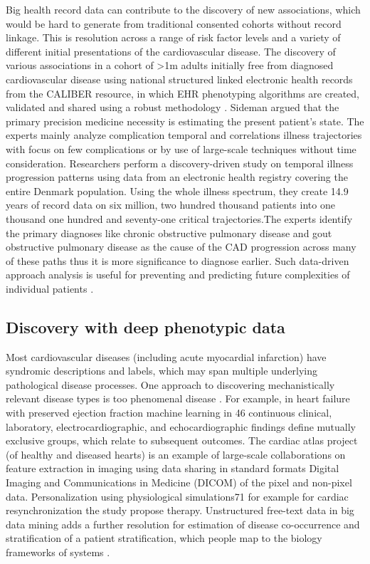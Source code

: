 \documentclass[sigconf]{acmart}
\begin{document}
Big health record data can contribute to the discovery of new associations, which would be hard to generate from traditional consented cohorts without record linkage.  This is resolution across a range of risk factor levels and a variety of different initial presentations of the cardiovascular disease. The discovery of various associations in a cohort of >1m adults initially free from diagnosed cardiovascular disease using national structured linked electronic health records from the CALIBER resource, in which EHR phenotyping algorithms are created, validated and shared using a robust methodology \cite{wang2005framingham}.
Sideman \cite{sideman1985simulation}argued that the primary precision medicine necessity is estimating the present patient's state. The experts mainly analyze complication temporal and correlations illness trajectories with focus on few complications or by use of large-scale techniques without time consideration. Researchers perform a discovery-driven study on temporal illness progression patterns using data from an electronic health registry covering the entire Denmark population. Using the whole illness spectrum, they create 14.9 years of record data on six million, two hundred thousand patients into one thousand one hundred and seventy-one critical trajectories.The experts identify the primary diagnoses like chronic obstructive pulmonary disease and gout obstructive pulmonary disease as the cause of the CAD progression across many of these paths thus it is more significance to diagnose earlier. Such data-driven approach analysis is useful for preventing and predicting future complexities of individual patients \cite{sideman1985simulation}.

\subsection{Discovery with deep phenotypic data}
Most cardiovascular diseases (including acute myocardial infarction) have syndromic descriptions and labels, which may span multiple underlying pathological disease processes. One approach to discovering mechanistically relevant disease types is too phenomenal disease \cite{sahaf2011comparing}. For example, in heart failure with preserved ejection fraction machine learning in 46 continuous clinical, laboratory, electrocardiographic, and echocardiographic findings define mutually exclusive groups, which relate to subsequent outcomes. The cardiac atlas project (of healthy and diseased hearts) is an example of large-scale collaborations on feature extraction in imaging using data sharing in standard formats Digital Imaging and Communications in Medicine (DICOM) of the pixel and non-pixel data. Personalization using physiological simulations71 for example for cardiac resynchronization the study propose therapy. Unstructured free-text data in big data mining adds a further resolution for estimation of disease co-occurrence and stratification of a patient stratification, which people map to the biology frameworks of systems \cite{sahaf2011comparing}.
\end{document}
